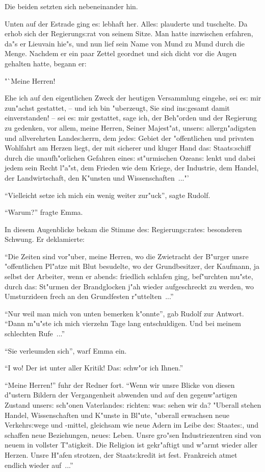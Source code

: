\documentclass[oneside,12pt]{book}
\newcommand{\s}{s:}%
\begin{document}
Die beiden setzten sich nebeneinander hin.

Unten auf der Estrade ging e{\s} lebhaft her. Alle{\s} plauderte
und tuschelte. Da erhob sich der Regierung{\s}rat von seinem
Sitze. Man hatte inzwischen erfahren, da"s er Lieuvain hie"s, und
nun lief sein Name von Mund zu Mund durch die Menge. Nachdem er
ein paar Zettel geordnet und sich dicht vor die Augen gehalten
hatte, begann er:

"`Meine Herren!

Ehe ich auf den eigentlichen Zweck der heutigen Versammlung
eingehe, sei e{\s} mir zun"achst gestattet, -- und ich bin
"uberzeugt, Sie sind in{\s}gesamt damit einverstanden! -- sei
e{\s} mir gestattet, sage ich, der Beh"orden und der Regierung zu
gedenken, vor allem, meine Herren, Seiner Majest"at, unser{\s}
allergn"adigsten und allverehrten Lande{\s}herrn, dem jede{\s}
Gebiet der "offentlichen und privaten Wohlfahrt am Herzen liegt,
der mit sicherer und kluger Hand da{\s} Staat{\s}schiff durch die
unaufh"orlichen Gefahren eine{\s} st"urmischen Ozean{\s} lenkt und
dabei jedem sein Recht l"a"st, dem Frieden wie dem Kriege, der
Industrie, dem Handel, der Landwirtschaft, den K"unsten und
Wissenschaften~..."'

"`Vielleicht setze ich mich ein wenig weiter zur"uck"', sagte
Rudolf.

"`Warum?"' fragte Emma.

In diesem Augenblicke bekam die Stimme de{\s}
Regierung{\s}rate{\s} besonderen Schwung. Er deklamierte:

"`Die Zeiten sind vor"uber, meine Herren, wo die Zwietracht der
B"urger unsre "offentlichen Pl"atze mit Blut besudelte, wo der
Grundbesitzer, der Kaufmann, ja selbst der Arbeiter, wenn er
abend{\s} friedlich schlafen ging, bef"urchten mu"ste, durch
da{\s} St"urmen der Brandglocken j"ah wieder aufgeschreckt zu
werden, wo Umsturzideen frech an den Grundfesten r"uttelten~..."'

"`Nur weil man mich von unten bemerken k"onnte"', gab Rudolf zur
Antwort. "`Dann m"u"ste ich mich vierzehn Tage lang entschuldigen.
Und bei meinem schlechten Rufe~..."'

"`Sie verleumden sich"', warf Emma ein.

"`I wo! Der ist unter aller Kritik! Da{\s} schw"or ich Ihnen."'

"`Meine Herren!"' fuhr der Redner fort. "`Wenn wir unsre Blicke
von diesen d"ustern Bildern der Vergangenheit abwenden und auf den
gegenw"artigen Zustand unser{\s} sch"onen Vaterlande{\s} richten:
wa{\s} sehen wir da? "Uberall stehen Handel, Wissenschaften und
K"unste in Bl"ute, "uberall erwachsen neue Verkehr{\s}wege und
-mittel, gleichsam wie neue Adern im Leibe de{\s} Staate{\s}, und
schaffen neue Beziehungen, neue{\s} Leben. Unsre gro"sen
Industriezentren sind von neuem in vollster T"atigkeit. Die
Religion ist gekr"aftigt und w"armt wieder aller Herzen. Unsre
H"afen strotzen, der Staat{\s}kredit ist fest. Frankreich atmet
endlich wieder auf~..."'
\end{document}
